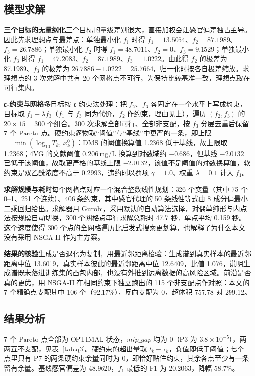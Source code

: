 \subsection{模型求解}

\noindent\textbf{三个目标的无量纲化}\quad 三个目标的量级差别很大，直接加权会让感官偏差独占主导。因此先求理想点与最差点：单独最小化 $f_1$ 时得 $f_1=13.5064$、$f_2=87.1989$、$f_3=26.7886$；单独最小化 $f_2$ 时得 $f_1=48.7011$、$f_2=0$、$f_3=9.1529$；单独最小化 $f_3$ 时得 $f_1=47.2083$、$f_2=87.1989$、$f_3=1.0222$。由此得 $f_2$ 的极差为 87.1989、$f_3$ 的极差为 $26.7886-1.0222=25.7664$，归一化时按各自极差缩放。求理想点的 3 次求解中共有 20 个网格点不可行，为保持比较基准一致，理想点取在可行集内。

\noindent\textbf{ε-约束与网格}\quad 多目标按 ε-约束法处理：把 $f_2$、$f_3$ 各固定在一个水平上写成约束，目标取 $f_1+\lambda f_3$（$f_1$ 与 $f_3$ 同为代价，$f_2$ 作约束，理由见上），遍历 $(f_2,f_3)$ 的 $20\times15=300$ 个组合。300 次求解全部可行、全部非支配，按 $f_3$ 分层去重后保留 7 个 Pareto 点。硬约束逐物取“阈值”与“基线”中更严的一条，即上限 $=\min(\log_{10}T_k,\,x_k^{0})$：DMS 的阈值换算值 1.2368 低于基线，故上限取 1.2368；4VG 的文献阈值 0.206\,mg/L 换算到对数域约 $-0.686$，但基线 $-2.0132$ 已低于该阈值，故取更严格的基线上限 $-2.0132$，该值不是阈值的对数换算值，软约束是双乙酰浓度不高于 0.2993，违约时以罚项 $\gamma=1.0$、权重 $\lambda=0.1$ 计入 $f_1$。

\noindent\textbf{求解规模与耗时}\quad 每个网格点对应一个混合整数线性规划：326 个变量（其中 75 个 0--1、251 个连续）、406 条约束，其中感官代理的 50 条线性等式由 8 成分偏最小二乘回归给出。求解器用 Gurobi，采用默认的自动算法选择，对偶单纯形与内点法按规模自动切换，300 个网格点串行求解总耗时 47.7 秒，单点平均 0.159 秒。这个速度使得 300 个点的全网格遍历比启发式搜索更划算，也解释了为什么本文没有采用 NSGA-II 作为主方案。

\noindent\textbf{结果的核验}\quad 生成是否退化为复制，用最近邻距离检验：生成谱到真实样本的最近邻距离中位 13.6019，真实样本彼此的最近邻距离中位 12.6409，比值 1.076，说明生成谱既未落进训练集的凸包内部，也没有外推到远离数据的高风险区域。前沿是否真的更优，用 NSGA-II 在相同约束下独立跑出的 115 个非支配点作对照：本文的 7 个精确点支配其中 106 个（92.17\%），反向支配为 0，超体积 757.78 对 299.12。

\subsection{结果分析}

7 个 Pareto 点全部为 OPTIMAL 状态，$mip\_gap$ 均为 0（P3 为 $3.8\times10^{-5}$），两两互不支配，见表~\ref{tab:q3}。硬约束的超出量取 $t_k-\tau_k$，负值即低于阈值；七个点里只有 P7 的两条硬约束余量同时为 0，即恰好贴住约束，其余各点至少有一条留有余量。基线感官偏差为 48.9620，$f_1$ 最低的 P1 为 20.2063，降幅 58.7\%。

